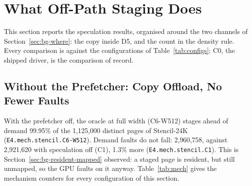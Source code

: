 
\section{What Off-Path Staging Does}
\label{sec:spec}
\label{sec:squeeze}

This section reports the speculation results, organised around the two
channels of Section~\ref{sec:bg-where}: the copy inside D5, and the count in
the density rule. Every comparison is against the configurations of
Table~\ref{tab:configs}; C0, the shipped driver, is the comparison of record.

\subsection{Without the Prefetcher: Copy Offload, No Fewer Faults}
\label{sec:spec-off}

With the prefetcher off, the oracle at full width (C6-W512) stages ahead of
demand 99.95\% of the 1{,}125{,}000 distinct pages of Stencil-24K
(\texttt{E4.mech.stencil.C6-W512}). Demand faults do not fall: 2{,}960{,}758,
against 2{,}921{,}620 with speculation off (C1), 1.3\% more
(\texttt{E4.mech.stencil.C1}). This is Section~\ref{sec:bg-resident-mapped}
observed: a staged page is resident, but still unmapped, so the GPU faults on
it anyway. Table~\ref{tab:mech} gives the mechanism counters for every
configuration of this section.

\begin{table}[t]
\centering
\footnotesize
\caption{Mechanism of speculation on Stencil-24K (E4, E5; medians of 10
runs): demand faults, faults on pages the worker had already made resident,
pages in the regions the worker staged (a region requested again counts again),
and D5 in total and per demand fault.}
\label{tab:mech}

\end{table}

